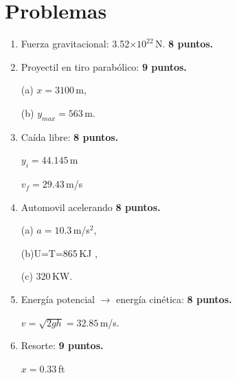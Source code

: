 \documentclass[]{article}
\begin{document}
\section*{Problemas} %
\label{sec:problemas2}


\begin{enumerate}

\item Fuerza gravitacional: 3.52$\times 10^{22}$\,N.
\hfill \textbf{8 puntos.}

\item Proyectil en tiro parab\'olico:
\hfill \textbf{9 puntos.}

(a) $x=3100$\,m,

(b) $y_{max} = 563$\,m. 

\newpage
\item Ca\'ida libre:
\hfill \textbf{8 puntos.}

$y_{i} =  44.145$\,m

$v_{f} = 29.43$\,m/s

\item Automovil acelerando
\hfill \textbf{8 puntos.}

(a) $a=10.3$\,m/s$^{2}$,

(b)U=T=865\,KJ ,

(c) 320\,KW.

\item Energ\'ia potencial $\rightarrow$ energ\'ia cin\'etica:
\hfill \textbf{8 puntos.}

$v=\sqrt{2gh} = 32.85$\,m/s.

\item Resorte:
\hfill \textbf{9 puntos.}

$x=0.33$\,ft

\end{enumerate}
\end{document}
